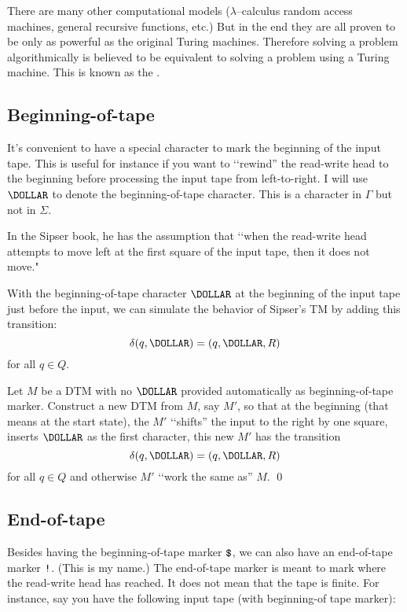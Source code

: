 There are many other computational models ($\lambda$--calculus
random access machines, general recursive functions, etc.) But in
the end they are all proven to be only as powerful as the original
Turing machines. Therefore solving a problem algorithmically is
believed to be equivalent to solving a problem using a Turing
machine. This is known as the
.



\newpage
\subsection{Beginning-of-tape}

It's convenient to have a special character to mark the beginning of
the input tape.
This is useful for instance if you want to \lq\lq rewind'' the read-write
head to the beginning before processing the input tape from left-to-right.
I will use $\DOLLAR$ to denote the beginning-of-tape character.
This is a character in $\Gamma$ but not in $\Sigma$.

In the Sipser book, he has the assumption that \lq\lq when the read-write
head attempts to move left at the first square of the input tape,
then it does not move."

With the beginning-of-tape character $\DOLLAR$ at the beginning of the
input tape just before the input, we can simulate the behavior of
Sipser's TM by adding this transition:
\[
\delta(q, \DOLLAR) = (q, \DOLLAR, R)
\]
for all $q \in Q$.


\begin{ex}
Let $M$ be a DTM with no $\DOLLAR$ provided automatically as
beginning-of-tape marker.
Construct a new DTM from $M$, say $M'$,
so that at the beginning (that means at the start state),
the $M'$ \lq\lq shifts'' the input to the right by one square,
inserts $\DOLLAR$ as the first character, this new $M'$ has
the transition
\[
\delta(q, \DOLLAR) = (q, \DOLLAR, R)
\]
for all $q \in Q$
and otherwise $M'$ \lq\lq work the same as'' $M$.
\qed
\end{ex}


\newpage
\subsection{End-of-tape}

Besides having the beginning-of-tape marker $\operatorname{\text{\texttt{\$}}}$,
we can also have an end-of-tape marker $\operatorname{\text{\texttt{!}}}$.
(This is my name.)
The end-of-tape marker is meant to mark where the read-write head has reached.
It does not mean that the tape is finite.
For instance, say you have the following input tape (with beginning-of
tape marker):

